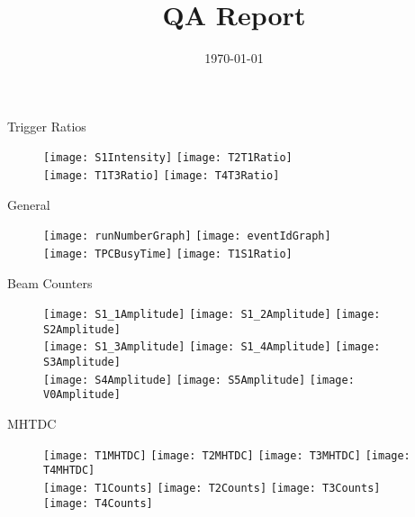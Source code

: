 \documentclass[11pt]{beamer}
\title[QA]{QA Report}
\date{\today}
\begin{document}
\begin{frame}
  \titlepage
\end{frame}

\begin{frame}{Trigger Ratios}
\begin{figure}
\centering
\texttt{[image: S1Intensity]}
\texttt{[image: T2T1Ratio]} \\
\texttt{[image: T1T3Ratio]}
\texttt{[image: T4T3Ratio]} \\
\end{figure}
\end{frame}

\begin{frame}{General}
\begin{figure}
\centering
\texttt{[image: runNumberGraph]}
\texttt{[image: eventIdGraph]} \\
\texttt{[image: TPCBusyTime]}
\texttt{[image: T1S1Ratio]} \\
\end{figure}
\end{frame}

\begin{frame}{Beam Counters}
\begin{figure}
\centering
\texttt{[image: S1\_1Amplitude]} 
\texttt{[image: S1\_2Amplitude]}
\texttt{[image: S2Amplitude]} \\
\texttt{[image: S1\_3Amplitude]}
\texttt{[image: S1\_4Amplitude]}
\texttt{[image: S3Amplitude]} \\
\texttt{[image: S4Amplitude]}
\texttt{[image: S5Amplitude]} 
\texttt{[image: V0Amplitude]} \\
\end{figure}
\end{frame}


\begin{frame}{MHTDC}
\begin{figure}
\centering
\texttt{[image: T1MHTDC]} 
\texttt{[image: T2MHTDC]} 
\texttt{[image: T3MHTDC]} 
\texttt{[image: T4MHTDC]} \\
\texttt{[image: T1Counts]} 
\texttt{[image: T2Counts]} 
\texttt{[image: T3Counts]} 
\texttt{[image: T4Counts]} 
\end{figure}
\end{frame}
\end{document}

